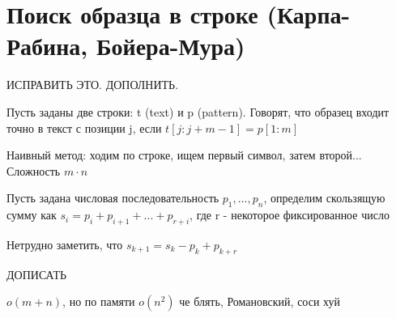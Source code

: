 \documentclass[discrete.tex]{subfiles}
\begin{document}
\section{Поиск образца в строке (Карпа-Рабина, Бойера-Мура)}
ИСПРАВИТЬ ЭТО. ДОПОЛНИТЬ.
\begin{definition}
  Пусть заданы две строки: t (text) и p (pattern). Говорят, что образец входит точно в текст с позиции j, если $t[j:j+m-1] = p[1:m]$
\end{definition}

Наивный метод: ходим по строке, ищем первый символ, затем второй... Сложность $m \cdot n$

\begin{definition}
  Пусть задана числовая последовательность $p_1,...,p_n$, определим скользящую сумму как $s_i=p_i+p_{i+1}+...+p_{r+i}$, где r - некоторое фиксированное число
\end{definition}

\begin{remark}
  Нетрудно заметить, что $s_{k+1} = s_k - p_k + p_{k+r}$
\end{remark}

ДОПИСАТЬ

\begin{alg}
  $o(m+n)$, но по памяти $o(n^2)$ че блять, Романовский, соси хуй
\end{alg}
\end{document}
